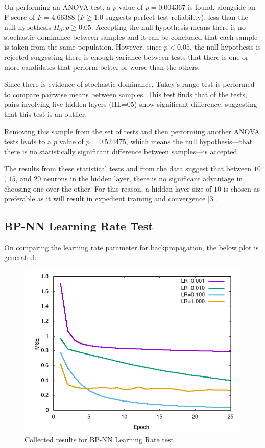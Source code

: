\documentclass[a4paper,12pt]{article}
\begin{document}
On performing an ANOVA test, a $p$ value of $p = 0.004367$ is found, alongside an F-score of $F = 4.66388$ ($F \geq 1.0$ suggests perfect test reliability), less than the null hypothesis $H_0 : p \geq 0.05$. Accepting the null hypothesis means there is no stochastic dominance between samples and it can be concluded that each sample is taken from the same population. However, since $p < 0.05$, the null hypothesis is rejected suggesting there is enough variance between tests that there is one or more candidates that perform better or worse than the others.

\pagebreak

Since there is evidence of stochastic dominance, Tukey's range test is performed to compare pairwise means between samples. This test finds that of the tests, pairs involving five hidden layers (HL=05) show significant difference, suggesting that this test is an outlier.

Removing this sample from the set of tests and then performing another ANOVA tests leads to a $p$ value of $p = 0.524475$, which means the null hypothesis---that there is no statistically significant difference between samples---is accepted.

The results from these statistical tests and from the data suggest that between $10$, $15$, and $20$ neurons in the hidden layer, there is no significant advantage in choosing one over the other. For this reason, a hidden layer size of $10$ is chosen as preferable as it will result in expedient training and convergence [3].

\subsection{BP-NN Learning Rate Test}

On comparing the learning rate parameter for backpropagation, the below plot is generated:

\begin{figure}[h!]
\centering
\includegraphics[scale=0.60]{images/bp-lr-plot.png}
\caption{Collected results for BP-NN Learning Rate test}
\label{fig:bp-nn-lr}
\end{figure}
\end{document}
